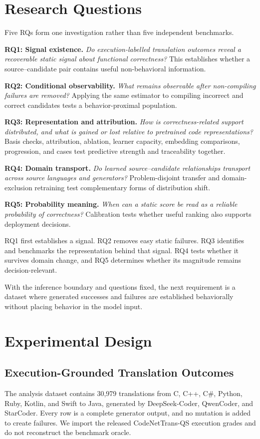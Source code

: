 \documentclass[conference]{IEEEtran}
\begin{document}
\section{Research Questions}
Five RQs form one investigation rather than five independent benchmarks.

\textbf{RQ1: Signal existence.} \emph{Do execution-labelled translation outcomes reveal a recoverable static signal about functional correctness?} This establishes whether a source--candidate pair contains useful non-behavioral information.

\textbf{RQ2: Conditional observability.} \emph{What remains observable after non-compiling failures are removed?} Applying the same estimator to compiling incorrect and correct candidates tests a behavior-proximal population.

\textbf{RQ3: Representation and attribution.} \emph{How is correctness-related support distributed, and what is gained or lost relative to pretrained code representations?} Basis checks, attribution, ablation, learner capacity, embedding comparisons, progression, and cases test predictive strength and traceability together.

\textbf{RQ4: Domain transport.} \emph{Do learned source--candidate relationships transport across source languages and generators?} Problem-disjoint transfer and domain-exclusion retraining test complementary forms of distribution shift.

\textbf{RQ5: Probability meaning.} \emph{When can a static score be read as a reliable probability of correctness?} Calibration tests whether useful ranking also supports deployment decisions.

RQ1 first establishes a signal. RQ2 removes easy static failures. RQ3 identifies and benchmarks the representation behind that signal. RQ4 tests whether it survives domain change, and RQ5 determines whether its magnitude remains decision-relevant.

With the inference boundary and questions fixed, the next requirement is a dataset where generated successes and failures are established behaviorally without placing behavior in the model input.

\section{Experimental Design}
\subsection{Execution-Grounded Translation Outcomes}
The analysis dataset contains 30,979 translations from C, C++, C\#, Python, Ruby, Kotlin, and Swift to Java, generated by DeepSeek-Coder, QwenCoder, and StarCoder. Every row is a complete generator output, and no mutation is added to create failures. We import the released CodeNetTrans-QS execution grades and do not reconstruct the benchmark oracle.
\end{document}
